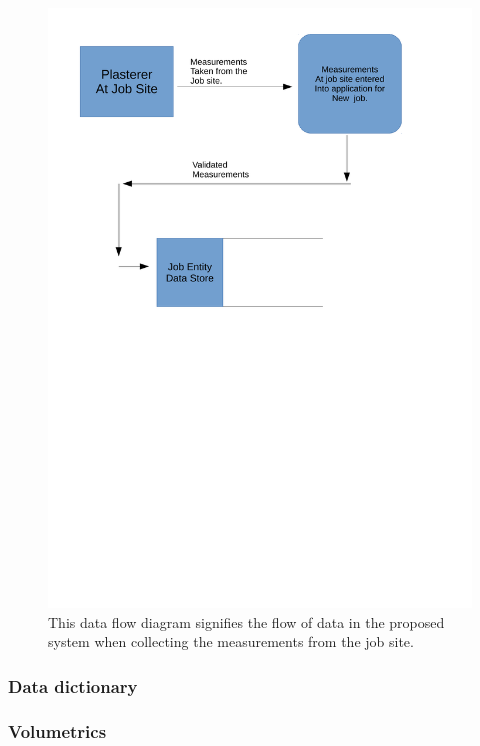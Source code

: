 \begin{figure}[H]
    \includegraphics[width=\textwidth]{./Analysis/images/proposedSystemGettingMeasurements.pdf}
    \caption{This data flow diagram signifies the flow of data in the proposed system when collecting the measurements from the job site.} \label{fig:proposed_system_dfd_2}
\end{figure}



\subsubsection{Data dictionary}



\subsubsection{Volumetrics}

